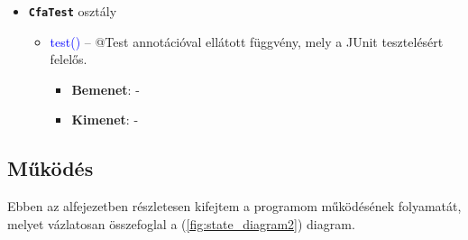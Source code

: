 \begin{itemize}
	\item \textbf{\texttt{CfaTest}} osztály
	\begin{itemize}
		\item \textcolor{blue}{test()} -- @Test annotációval ellátott függvény, mely a JUnit tesztelésért felelős.
		\begin{itemize}
			\item \textbf{Bemenet}: -
			\item \textbf{Kimenet}: -
		\end{itemize}
	\end{itemize}
\end{itemize}

\subsection{Működés}
Ebben az alfejezetben részletesen kifejtem a programom működésének folyamatát, melyet vázlatosan összefoglal a (\ref{fig:state_diagram2}) diagram.

